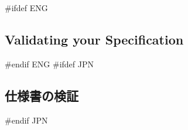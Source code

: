 \documentclass[\pformat,12pt]{article}
\newcommand{\guicmd}[1]{{\sf #1}}
\newcommand{\guicmd}[1]{{\gt #1}}
\begin{document}






#ifdef ENG
\subsection{Validating your Specification}
#endif ENG
#ifdef JPN
\subsection{仕様書の検証}
#endif JPN
\end{document}
